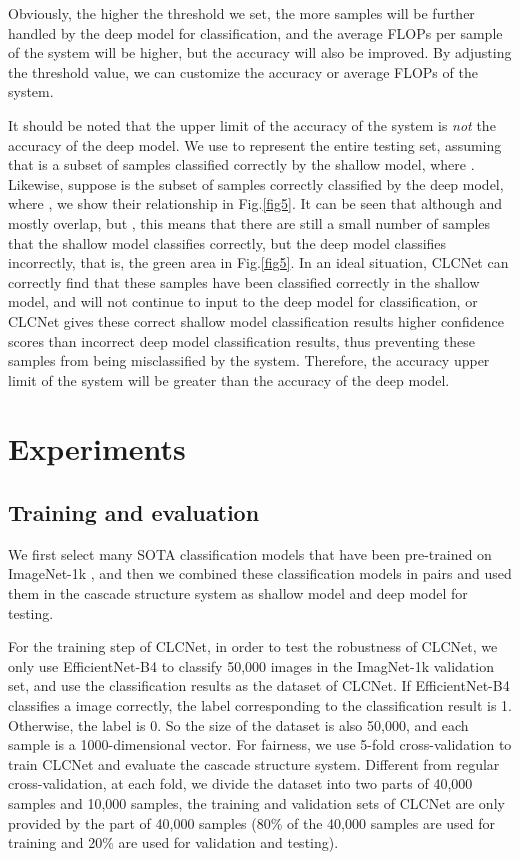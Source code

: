\documentclass{article}
\begin{document}
Obviously, the higher the threshold we set, the more samples will be further handled by the deep model for classification, and the average FLOPs per sample of the system will be higher, but the accuracy will also be improved. By adjusting the threshold value, we can customize the accuracy or average FLOPs of the system.


It should be noted that the upper limit of the accuracy of the system is \emph{not} the accuracy of the deep model. We use  to represent the entire testing set, assuming that  is a subset of samples classified correctly by the shallow model, where . Likewise, suppose  is the subset of samples correctly classified by the deep model, where , we show their relationship in Fig.\ref{fig5}. It can be seen that although  and  mostly overlap, but , this means that there are still a small number of samples that the shallow model classifies correctly, but the deep model classifies incorrectly, that is, the green area in Fig.\ref{fig5}. In an ideal situation, CLCNet can correctly find that these samples have been classified correctly in the shallow model, and will not continue to input to the deep model for classification, or CLCNet gives these correct shallow model classification results higher confidence scores than incorrect deep model classification results, thus preventing these samples from being misclassified by the system. Therefore, the accuracy upper limit of the system will be greater than the accuracy of the deep model.


\section{Experiments}
\label{experiments}

\subsection{Training and evaluation}
\label{4-1}
We first select many SOTA classification models that have been pre-trained on ImageNet-1k \cite{deng2009imagenet}, and then we combined these classification models in pairs and used them in the cascade structure system as shallow model and deep model for testing.


For the training step of CLCNet, in order to test the robustness of CLCNet, we only use EfficientNet-B4 \cite{tan2019efficientnet} to classify 50,000 images in the ImagNet-1k validation set, and use the classification results as the dataset of CLCNet. If EfficientNet-B4 classifies a image correctly, the label corresponding to the classification result is 1. Otherwise, the label is 0. So the size of the dataset is also 50,000, and each sample is a 1000-dimensional vector. For fairness, we use 5-fold cross-validation to train CLCNet and evaluate the cascade structure system. Different from regular cross-validation, at each fold, we divide the dataset into two parts of 40,000 samples and 10,000 samples, the training and validation sets of CLCNet are only provided by the part of 40,000 samples (80\% of the 40,000 samples are used for training and 20\% are used for validation and testing). 
\end{document}
